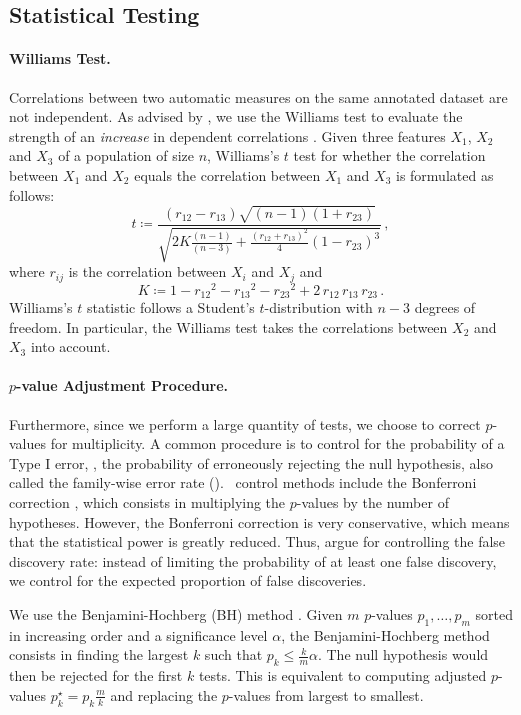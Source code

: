 \subsection{Statistical Testing}
\label{sub:hanna_statisical_testing}

\paragraph{Williams Test.}
Correlations between two automatic measures on the same annotated dataset are not independent. As advised by \citet{graham-baldwin-2014-testing}, we use the Williams test \citep{williams1959regression,moon2019williams} to evaluate the strength of an \emph{increase} in dependent correlations \citep{steiger1980tests}. Given three features $X_1$, $X_2$ and $X_3$ of a population of size $n$, Williams's $t$ test for whether the correlation between $X_1$ and $X_2$ equals the correlation between $X_1$ and $X_3$ is formulated as follows:
    \[ t \coloneqq \frac{(r_{12} - r_{13}) \sqrt{(n-1)(1+r_{23})}}{\sqrt{2K \frac{(n-1)}{(n-3)} + \frac{(r_{12} + r_{13})^2}{4} (1 - r_{23})^3}} \, , \]
where $r_{ij}$ is the correlation between $X_i$ and $X_j$ and
    \[ K \coloneqq 1 - {r_{12}}^2 - {r_{13}}^2 - {r_{23}}^2 + 2 \, r_{12} \, r_{13} \, r_{23} \, . \]
Williams's $t$ statistic follows a Student's $t$-distribution with $n-3$ degrees of freedom. In particular, the Williams test takes the correlations between $X_2$ and $X_3$ into account.

\paragraph{$p$-value Adjustment Procedure.}
Furthermore, since we perform a large quantity of tests, we choose to correct $p$-values for multiplicity. A common procedure is to control for the probability of a Type I error, \ie, the probability of erroneously rejecting the null hypothesis, also called the family-wise error rate (\fwer). \fwer\ control methods include the Bonferroni correction \citep{dunn1959estimation}, which consists in multiplying the $p$-values by the number of hypotheses. However, the Bonferroni correction is very conservative, which means that the statistical power is greatly reduced. Thus, \citet{jafari2019and, lydersen2021adjustment} argue for controlling the false discovery rate: instead of limiting the probability of at least one false discovery, we control for the expected proportion of false discoveries.

We use the Benjamini-Hochberg (BH) method \citep{benjamini1995controlling}. Given $m$ $p$-values $p_1, \dots, p_m$ sorted in increasing order and a significance level $\alpha$, the Benjamini-Hochberg method consists in finding the largest $k$ such that $p_k \leq \frac{k}{m} \alpha$. The null hypothesis would then be rejected for the first $k$ tests. This is equivalent to computing adjusted $p$-values $p_k^\star = p_k \frac{m}{k}$ and replacing the $p$-values from largest to smallest.


